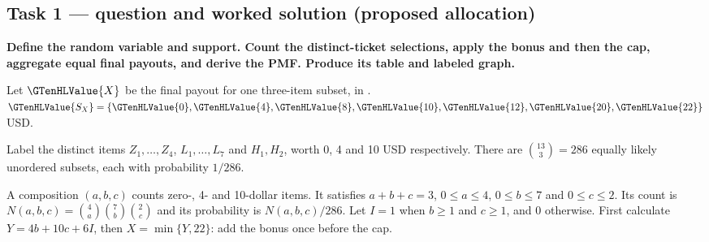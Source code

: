 \subsection*{Task 1 --- question and worked solution (proposed allocation) }
\label{sol:q6t1}

\noindent\textbf{\boldmath Define the random variable and support. Count the distinct-ticket selections, apply the bonus and then the cap, aggregate equal final payouts, and derive the PMF. Produce its table and labeled graph.}\par\nopagebreak

Let $\GTenHLValue{X}$ be the final payout for one three-item subset, in . $\GTenHLValue{S_X}=\{\GTenHLValue{0},\GTenHLValue{4},\GTenHLValue{8},\GTenHLValue{10},\GTenHLValue{12},\GTenHLValue{20},\GTenHLValue{22}\}$ USD.

Label the distinct items $Z_1,\ldots,Z_4$, $L_1,\ldots,L_7$ and $H_1,H_2$, worth 0, 4 and 10 USD respectively. There are $\binom{13}3=286$ equally likely unordered subsets, each with probability $1/286$.

A composition $(a,b,c)$ counts zero-, 4- and 10-dollar items. It satisfies $a+b+c=3$, $0\leq a\leq 4$, $0\leq b\leq 7$ and $0\leq c\leq 2$. Its count is $N(a,b,c)=\binom{4}a\binom{7}b\binom{2}c$ and its probability is $N(a,b,c)/286$. Let $I=1$ when $b\geq1$ and $c\geq1$, and 0 otherwise. First calculate $Y=4b+10c+6I$, then $X=\min\{Y,22\}$: add the bonus once before the cap.

